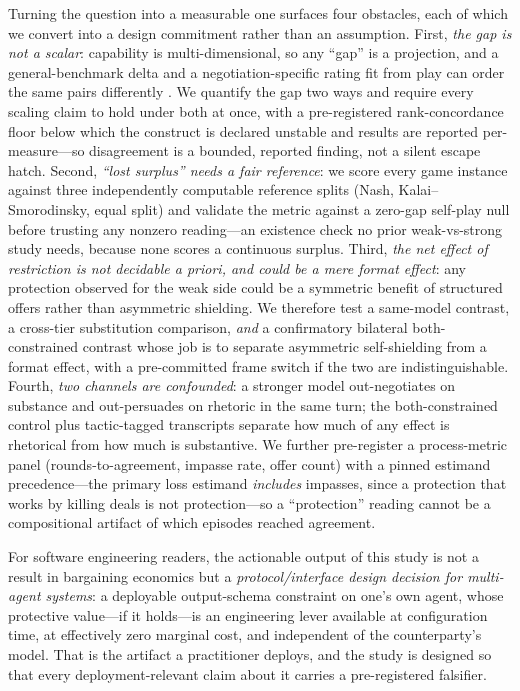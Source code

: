 \documentclass[conference]{IEEEtran}
\begin{document}
Turning the question into a measurable one surfaces four obstacles, each of which we convert into a design commitment rather than an assumption. First, \emph{the gap is not a scalar}: capability is multi-dimensional, so any ``gap'' is a projection, and a general-benchmark delta and a negotiation-specific rating fit from play can order the same pairs differently \cite{GreatModelsThinkAlike}. We quantify the gap two ways and require every scaling claim to hold under both at once, with a pre-registered rank-concordance floor below which the construct is declared unstable and results are reported per-measure---so disagreement is a bounded, reported finding, not a silent escape hatch. Second, \emph{``lost surplus'' needs a fair reference}: we score every game instance against three independently computable reference splits (Nash, Kalai--Smorodinsky, equal split) and validate the metric against a zero-gap self-play null before trusting any nonzero reading---an existence check no prior weak-vs-strong study needs, because none scores a continuous surplus. Third, \emph{the net effect of restriction is not decidable a priori, and could be a mere format effect}: any protection observed for the weak side could be a symmetric benefit of structured offers rather than asymmetric shielding. We therefore test a same-model contrast, a cross-tier substitution comparison, \emph{and} a confirmatory bilateral both-constrained contrast whose job is to separate asymmetric self-shielding from a format effect, with a pre-committed frame switch if the two are indistinguishable. Fourth, \emph{two channels are confounded}: a stronger model out-negotiates on substance and out-persuades on rhetoric in the same turn; the both-constrained control plus tactic-tagged transcripts separate how much of any effect is rhetorical from how much is substantive. We further pre-register a process-metric panel (rounds-to-agreement, impasse rate, offer count) with a pinned estimand precedence---the primary loss estimand \emph{includes} impasses, since a protection that works by killing deals is not protection---so a ``protection'' reading cannot be a compositional artifact of which episodes reached agreement.

For software engineering readers, the actionable output of this study is not a result in bargaining economics but a \emph{protocol/interface design decision for multi-agent systems}: a deployable output-schema constraint on one's own agent, whose protective value---if it holds---is an engineering lever available at configuration time, at effectively zero marginal cost, and independent of the counterparty's model. That is the artifact a practitioner deploys, and the study is designed so that every deployment-relevant claim about it carries a pre-registered falsifier.
\end{document}
